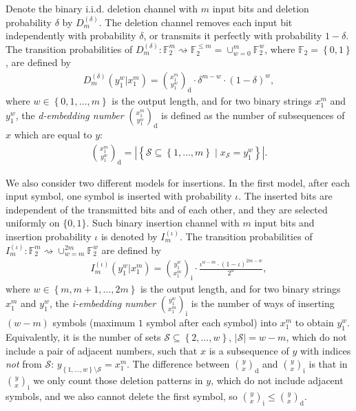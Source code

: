 \documentclass[journal, twocol]{IEEEtran}
\newcommand{\dlbinom}[2]{{\binom{#1}{#2}_{\!\text{d}}}}
\newcommand{\ibinom}[2]{{\binom{#1}{#2}_{\!\text{i}}}}
\newcommand{\bF}{{\mathbb{F}}}
\newcommand{\mS}{{\mathcal{S}}}
\newcommand{\set}[1]{{\left\{{#1}\right\}}}
\newcommand{\brabs}[1]{{\left|{#1}\right|}}
\newcommand{\tosq}{\rightsquigarrow}
\begin{document}
Denote the binary i.i.d. deletion channel with $m$ input bits and deletion probability $\delta$ by $D_m^{(\delta)}$.
The deletion channel removes each input bit independently with probability $\delta$, or transmits it perfectly with probability $1-\delta$.
The transition probabilities of $D_m^{(\delta)}:\bF_2^m\tosq \bF_2^{\leq m} = \cup_{w=0}^m \bF_2^w$, where $\bF_2=\set{0,1}$,  are defined by
\begin{align}
D^{(\delta)}_m(y_1^w|x_1^m)=\dlbinom{x_1^m}{y_1^w}\cdot \delta^{m-w} \cdot (1-\delta)^w,
\label{eq:bdc}
\end{align}
where $w\in\set{0,1,\dots,m}$ is the output length, and for two binary strings $x_1^m$ and $y_1^w$, the \emph{d-embedding number} $\dlbinom{x_1^m}{y_1^w}$ is defined as the number of subsequences of $x$ which are equal to $y$:
\begin{align}
\dlbinom{x_1^m}{y_1^w}=\brabs{\set{\mS\subseteq \set{1,\dots,m} \mid x_\mS=y_1^w}}.
\label{eq:embdef}
\end{align}

We also consider two different models for insertions. 
In the first model, after each input symbol, one symbol is inserted with probability $\iota$. The inserted bits are independent of the transmitted bits and of each other, and they are selected uniformly on $\{0,1\}$. 
Such binary insertion channel with $m$ input bits and insertion probability $\iota$ is denoted by $I_m^{(\iota)}$. 
The transition probabilities of $I_m^{(\iota)}:\bF_2^m\tosq \cup_{w=m}^{2m} \bF_2^w$ are defined by
\begin{align}
I^{(\iota)}_m(y_1^w|x_1^m)=\ibinom{y_1^w}{x_1^m} \cdot \frac{\iota^{w-m} \cdot (1-\iota)^{2m-w}}{2^w},
\label{eq:bic}
\end{align}
where $w\in\set{m,m+1,\dots,2m}$ is the output length, and for two binary strings $x_1^m$ and $y_1^w$, the \emph{i-embedding number} $\ibinom{y_1^w}{x_1^m}$ is the number of ways of inserting $(w-m)$ symbols (maximum $1$ symbol after each symbol) into $x_1^m$ to obtain $y_1^w$.
Equivalently, it is the number of sets $\mS\subseteq \set{2,\dots, w}$, $|\mS|=w-m$, which do not include a pair of adjacent numbers, such that $x$ is a subsequence of $y$ with indices \emph{not} from $\mS$: $y_{\set{1,\dots,w}\setminus\mS}=x_1^m$.
The difference between $\dlbinom{y}{x}$ and $\ibinom{y}{x}$ is that in $\ibinom{y}{x}$ we only count those deletion patterns in $y$, which do not include adjacent symbols, and we also cannot delete the first symbol, so $\ibinom{y}{x}\leq \dlbinom{y}{x}$.
\end{document}
